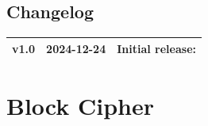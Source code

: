 \documentclass[11pt,openany]{article}
\begin{document}
\vfill
\subsection*{Changelog}
\large
\begin{tabular}{@{} L{0.05\textwidth} L{0.2\textwidth} L{0.7\textwidth} @{}} %
	\toprule
	v1.0 & 2024-12-24 & Initial release: \\%
	\bottomrule
\end{tabular}

\newpage


\tableofcontents
\newpage
\section{Block Cipher}

%
%
%
%

\vfill
\begin{thebibliography}{9}\large
\end{thebibliography}

\newpage
\appendix
%
%
\end{document}
